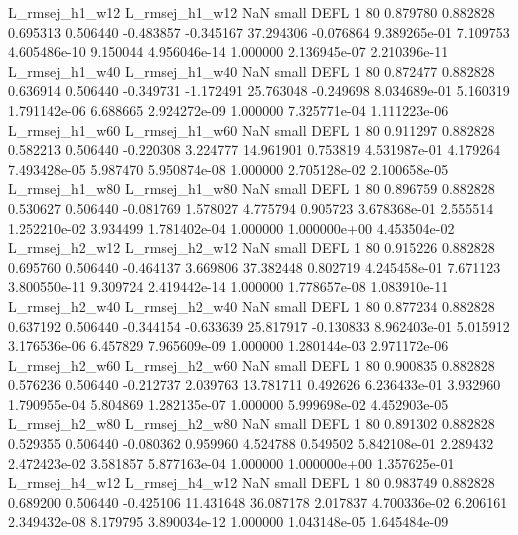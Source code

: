 L_rmsej_h1_w12 L_rmsej_h1_w12                   NaN      small     DEFL                 1 80 0.879780       0.882828 0.695313       0.506440   -0.483857     -0.345167     37.294306    -0.076864   9.389265e-01  7.109753 4.605486e-10     9.150044   4.956046e-14            1.000000    2.136945e-07        2.210396e-11
L_rmsej_h1_w40 L_rmsej_h1_w40                   NaN      small     DEFL                 1 80 0.872477       0.882828 0.636914       0.506440   -0.349731     -1.172491     25.763048    -0.249698   8.034689e-01  5.160319 1.791142e-06     6.688665   2.924272e-09            1.000000    7.325771e-04        1.111223e-06
L_rmsej_h1_w60 L_rmsej_h1_w60                   NaN      small     DEFL                 1 80 0.911297       0.882828 0.582213       0.506440   -0.220308      3.224777     14.961901     0.753819   4.531987e-01  4.179264 7.493428e-05     5.987470   5.950874e-08            1.000000    2.705128e-02        2.100658e-05
L_rmsej_h1_w80 L_rmsej_h1_w80                   NaN      small     DEFL                 1 80 0.896759       0.882828 0.530627       0.506440   -0.081769      1.578027      4.775794     0.905723   3.678368e-01  2.555514 1.252210e-02     3.934499   1.781402e-04            1.000000    1.000000e+00        4.453504e-02
L_rmsej_h2_w12 L_rmsej_h2_w12                   NaN      small     DEFL                 1 80 0.915226       0.882828 0.695760       0.506440   -0.464137      3.669806     37.382448     0.802719   4.245458e-01  7.671123 3.800550e-11     9.309724   2.419442e-14            1.000000    1.778657e-08        1.083910e-11
L_rmsej_h2_w40 L_rmsej_h2_w40                   NaN      small     DEFL                 1 80 0.877234       0.882828 0.637192       0.506440   -0.344154     -0.633639     25.817917    -0.130833   8.962403e-01  5.015912 3.176536e-06     6.457829   7.965609e-09            1.000000    1.280144e-03        2.971172e-06
L_rmsej_h2_w60 L_rmsej_h2_w60                   NaN      small     DEFL                 1 80 0.900835       0.882828 0.576236       0.506440   -0.212737      2.039763     13.781711     0.492626   6.236433e-01  3.932960 1.790955e-04     5.804869   1.282135e-07            1.000000    5.999698e-02        4.452903e-05
L_rmsej_h2_w80 L_rmsej_h2_w80                   NaN      small     DEFL                 1 80 0.891302       0.882828 0.529355       0.506440   -0.080362      0.959960      4.524788     0.549502   5.842108e-01  2.289432 2.472423e-02     3.581857   5.877163e-04            1.000000    1.000000e+00        1.357625e-01
L_rmsej_h4_w12 L_rmsej_h4_w12                   NaN      small     DEFL                 1 80 0.983749       0.882828 0.689200       0.506440   -0.425106     11.431648     36.087178     2.017837   4.700336e-02  6.206161 2.349432e-08     8.179795   3.890034e-12            1.000000    1.043148e-05        1.645484e-09
